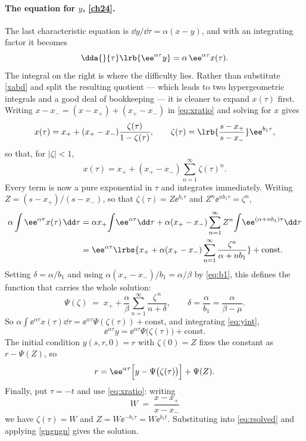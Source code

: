 \paragraph{The equation for $y$, \eqref{ch24}.}
The last characteristic equation is $\dd y/\dd\tau = \alpha(x-y)$, and with an
integrating factor it becomes
\begin{equation}
\label{eq:yint}
\dda{}{\tau}\lrb{\ee^{\alpha\tau}y} = \alpha\,\ee^{\alpha\tau}x(\tau).
\end{equation}
The integral on the right is where the difficulty lies. Rather than substitute
\cref{xabd} and split the resulting quotient --- which leads to two hypergeometric
integrals and a good deal of bookkeeping --- it is cleaner to expand $x(\tau)$ first.
Writing $x - x_- = (x-x_+) + (x_+-x_-)$ in \cref{eq:xratio} and solving for $x$ gives
\begin{equation}
\label{eq:xgeom}
x(\tau) = x_+ + (x_+-x_-)\frac{\zeta(\tau)}{1-\zeta(\tau)},
\qquad
\zeta(\tau) = \lrb{\frac{s-x_+}{s-x_-}}\ee^{b_1\tau},
\end{equation}
so that, for $|\zeta|<1$,
\begin{equation*}
x(\tau) = x_+ + (x_+-x_-)\sum_{n=1}^{\infty}\zeta(\tau)^n .
\end{equation*}
Every term is now a pure exponential in $\tau$ and integrates immediately. Writing
$Z = (s-x_+)/(s-x_-)$, so that $\zeta(\tau) = Z\ee^{b_1\tau}$ and
$Z^n\ee^{nb_1\tau} = \zeta^n$,
\begin{align*}
\alpha\int \ee^{\alpha\tau}x(\tau)\,\dd\tau
&= \alpha x_+\!\int\!\ee^{\alpha\tau}\dd\tau + \alpha(x_+-x_-)\sum_{n=1}^{\infty}Z^n\!\int\!\ee^{(\alpha+nb_1)\tau}\dd\tau\\
&= \ee^{\alpha\tau}\lrbs{x_+ + \alpha(x_+-x_-)\sum_{n=1}^{\infty}\frac{\zeta^n}{\alpha+nb_1}} + \text{const}.
\end{align*}
Setting $\delta = \alpha/b_1$ and using $\alpha(x_+-x_-)/b_1 = \alpha/\beta$ by
\cref{eq:b1}, this defines the function that carries the whole solution:
\begin{equation}
\label{eq:Psidef}
\Psi(\zeta) \;=\; x_+ + \frac{\alpha}{\beta}\sum_{n=1}^{\infty}\frac{\zeta^{\,n}}{n+\delta},
\qquad \delta = \frac{\alpha}{b_1} = \frac{\alpha}{\beta-\mu}.
\end{equation}
So $\alpha\int\ee^{\alpha\tau}x(\tau)\dd\tau = \ee^{\alpha\tau}\Psi(\zeta(\tau)) + \text{const}$,
and integrating \cref{eq:yint},
\begin{equation*}
\ee^{\alpha\tau}y = \ee^{\alpha\tau}\Psi\bigl(\zeta(\tau)\bigr) + \text{const}.
\end{equation*}
The initial condition $y(s,r,0)=r$ with $\zeta(0)=Z$ fixes the constant as
$r - \Psi(Z)$, so
\begin{equation}
\label{eq:rsolved}
r = \ee^{\alpha\tau}\Bigl[y - \Psi\bigl(\zeta(\tau)\bigr)\Bigr] + \Psi(Z).
\end{equation}
Finally, put $\tau=-t$ and use \cref{eq:xratio}: writing
\begin{equation*}
W \;=\; \frac{x-x_+}{x-x_-}
\end{equation*}
we have $\zeta(\tau) = W$ and $Z = W\ee^{-b_1\tau} = W\ee^{b_1 t}$. Substituting into
\cref{eq:rsolved} and applying \cref{gngngn} gives the solution.

